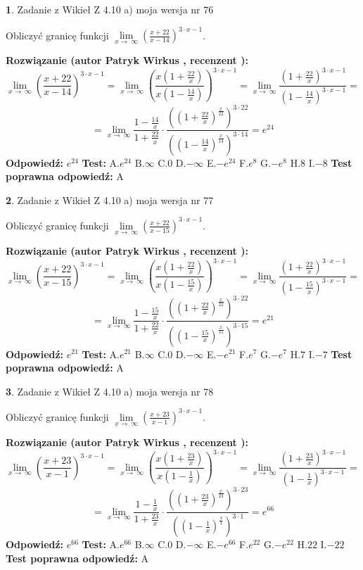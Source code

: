\documentclass[12pt, a4paper]{article}
\theoremstyle{definition} %
\newtheorem{zad}{}
\newcommand{\zadStart}[1]{\begin{zad}#1\newline}
\newcommand{\zadStop}{\end{zad}}
\newcommand{\rozwStart}[2]{\noindent \textbf{Rozwiązanie (autor #1 , recenzent #2): }\newline}
\newcommand{\rozwStop}{\newline}
\newcommand{\odpStart}{\noindent \textbf{Odpowiedź:}\newline}
\newcommand{\odpStop}{\newline}
\newcommand{\testStart}{\noindent \textbf{Test:}\newline}
\newcommand{\testStop}{\newline}
\newcommand{\kluczStart}{\noindent \textbf{Test poprawna odpowiedź:}\newline}
\newcommand{\kluczStop}{\newline}
\begin{document}
\zadStart{Zadanie z Wikieł Z 4.10 a) moja wersja nr 76}

Obliczyć granicę funkcji  $\lim\limits_{x\to\ \infty}(\frac{x+22}{x-14})^{3\cdot x-1}$.
\zadStop
\rozwStart{Patryk Wirkus}{}
$$\lim\limits_{x\to\ \infty}(\frac{x+22}{x-14})^{3\cdot x-1} = \lim\limits_{x\to\ \infty}(\frac{x(1+\frac{22}{x})}{x(1-\frac{14}{x})})^{3\cdot x-1}=\lim\limits_{x\to\ \infty}\frac{(1+\frac{22}{x})^{3\cdot x-1}}{(1-\frac{14}{x})^{3\cdot x-1}}=$$
$$=\lim\limits_{x\to\ \infty}\frac{1-\frac{14}{x}}{1+\frac{22}{x}}\cdot\frac{((1+\frac{22}{x})^{\frac{x}{22}})^{3\cdot22}}{((1-\frac{14}{x})^{\frac{x}{14}})^{3\cdot14}}=e^{24}$$
\rozwStop
\odpStart
$e^{24}$
\odpStop
\testStart
A.$e^{24}$ B.$\infty$ C.$0$ D.$-\infty$ E.$-e^{24}$
F.$e^{8}$ G.$-e^{8}$
H.$8$
I.$-8$
\testStop
\kluczStart
A
\kluczStop



\zadStart{Zadanie z Wikieł Z 4.10 a) moja wersja nr 77}

Obliczyć granicę funkcji  $\lim\limits_{x\to\ \infty}(\frac{x+22}{x-15})^{3\cdot x-1}$.
\zadStop
\rozwStart{Patryk Wirkus}{}
$$\lim\limits_{x\to\ \infty}(\frac{x+22}{x-15})^{3\cdot x-1} = \lim\limits_{x\to\ \infty}(\frac{x(1+\frac{22}{x})}{x(1-\frac{15}{x})})^{3\cdot x-1}=\lim\limits_{x\to\ \infty}\frac{(1+\frac{22}{x})^{3\cdot x-1}}{(1-\frac{15}{x})^{3\cdot x-1}}=$$
$$=\lim\limits_{x\to\ \infty}\frac{1-\frac{15}{x}}{1+\frac{22}{x}}\cdot\frac{((1+\frac{22}{x})^{\frac{x}{22}})^{3\cdot22}}{((1-\frac{15}{x})^{\frac{x}{15}})^{3\cdot15}}=e^{21}$$
\rozwStop
\odpStart
$e^{21}$
\odpStop
\testStart
A.$e^{21}$ B.$\infty$ C.$0$ D.$-\infty$ E.$-e^{21}$
F.$e^{7}$ G.$-e^{7}$
H.$7$
I.$-7$
\testStop
\kluczStart
A
\kluczStop



\zadStart{Zadanie z Wikieł Z 4.10 a) moja wersja nr 78}

Obliczyć granicę funkcji  $\lim\limits_{x\to\ \infty}(\frac{x+23}{x-1})^{3\cdot x-1}$.
\zadStop
\rozwStart{Patryk Wirkus}{}
$$\lim\limits_{x\to\ \infty}(\frac{x+23}{x-1})^{3\cdot x-1} = \lim\limits_{x\to\ \infty}(\frac{x(1+\frac{23}{x})}{x(1-\frac{1}{x})})^{3\cdot x-1}=\lim\limits_{x\to\ \infty}\frac{(1+\frac{23}{x})^{3\cdot x-1}}{(1-\frac{1}{x})^{3\cdot x-1}}=$$
$$=\lim\limits_{x\to\ \infty}\frac{1-\frac{1}{x}}{1+\frac{23}{x}}\cdot\frac{((1+\frac{23}{x})^{\frac{x}{23}})^{3\cdot23}}{((1-\frac{1}{x})^{\frac{x}{1}})^{3\cdot1}}=e^{66}$$
\rozwStop
\odpStart
$e^{66}$
\odpStop
\testStart
A.$e^{66}$ B.$\infty$ C.$0$ D.$-\infty$ E.$-e^{66}$
F.$e^{22}$ G.$-e^{22}$
H.$22$
I.$-22$
\testStop
\kluczStart
A
\kluczStop
\end{document}
